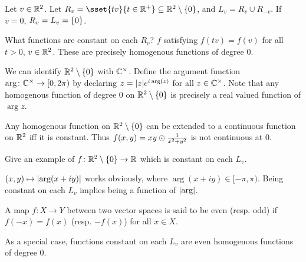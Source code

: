 Let $v \in \mathbb{R}^2$.
Let $R_v = \sset{tv}{t \in \R^+} \subseteq \R^2 \setminus \set 0$,
and $L_v = R_v \cup R_{-v}$.
If $v = 0$, $R_v = L_v = \{0\}$.

What functions are constant on each $R_v$?
$f$ satisfying $f(tv) = f(v)$ for all $t > 0$, $v \in \mathbb{R}^2$.
These are precisely homogenous functions of degree $0$.

We can identify $\mathbb{R}^2 \setminus \{0\}$ with $\mathbb{C}^\times$.
Define the argument function $\arg\colon \mathbb{C}^\times \to [0, 2\pi)$
by declaring $z = \lvert z\rvert e^{i \arg(z)}$ for all $z \in \mathbb{C}^\times$.
Note that any homogenous function of degree $0$ on $\mathbb{R}^2 \setminus \{0\}$
is precisely a real valued function of $\arg z$.

\begin{example}
    Any homogenous function on $\mathbb{R}^2 \setminus \{0\}$ can be extended to
    a continuous function on $\mathbb{R}^2$ iff it is constant.
    Thus $f(x, y) = xy \odot \frac1{x^2 + y^2}$ is not continuous at $0$.
\end{example}

\begin{question}
    Give an example of $f\colon \mathbb{R}^2 \setminus \{0\} \to \mathbb{R}$ which is
    constant on each $L_v$.
\end{question}
\begin{solution}
    $(x, y) \mapsto \lvert\arg(x + iy)\rvert$ works obviously, where
    $\arg(x + iy) \in [-\pi, \pi)$.
    Being constant on each $L_v$ implies being a function of $\lvert\arg\rvert$.
\end{solution}

\begin{definition}[evenness] \label{def:homo:even}
    A map $f\colon X \to Y$ between two vector spaces is said to be
    even (resp. odd) if $f(-x) = f(x)$ (resp. $-f(x)$) for all $x \in X$.
\end{definition}
As a special case, functions constant on each $L_v$ are even homogenous
functions of degree $0$.

